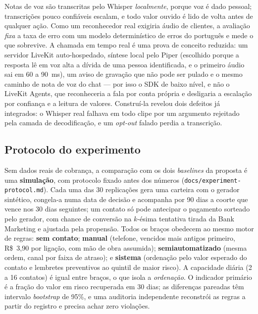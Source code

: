 \documentclass[portuguese]{sbcreviews-2025}%
\begin{document}
Notas de voz são transcritas pelo Whisper \cite{radford2023robust} \textit{localmente}, porque voz é dado pessoal; transcrições pouco confiáveis escalam, e todo valor ouvido é lido de volta antes de qualquer ação. Como um reconhecedor real exigiria áudio de clientes, a avaliação \textit{fixa} a taxa de erro com um modelo determinístico de erros do português e mede o que sobrevive. A chamada em tempo real é uma prova de conceito reduzida: um servidor LiveKit auto-hospedado, síntese local pelo Piper (escolhido porque a resposta lê em voz alta a dívida de uma pessoa identificada, e o primeiro áudio sai em 60 a 90~ms), um aviso de gravação que não pode ser pulado e o mesmo caminho de nota de voz do chat --- por isso o SDK de baixo nível, e não o LiveKit Agents, que reconheceria a fala por conta própria e desligaria a escalação por confiança e a leitura de valores. Construí-la revelou dois defeitos já integrados: o Whisper real falhava em todo clipe por um argumento rejeitado pela camada de decodificação, e um \textit{opt-out} falado perdia a transcrição.

\subsection{Protocolo do experimento}
\label{sec:protocolo}

Sem dados reais de cobrança, a comparação com os dois \textit{baselines} da proposta é uma \textbf{simulação}, com protocolo fixado antes dos números (\texttt{docs/experiment-protocol.md}). Cada uma das 30 replicações gera uma carteira com o gerador sintético, congela-a numa data de decisão e acompanha por 90 dias a coorte que vence nos 30 dias seguintes; um contato só pode antecipar o pagamento sorteado pelo gerador, com chance de conversão na $k$-ésima tentativa tirada da Bank Marketing e ajustada pela propensão. Todos os braços obedecem ao mesmo motor de regras: \textbf{sem contato}; \textbf{manual} (telefone, vencidos mais antigos primeiro, R\$~3,90 por ligação, com mão de obra assumida); \textbf{semiautomatizado} (mesma ordem, canal por faixa de atraso); e \textbf{sistema} (ordenação pelo valor esperado do contato e lembretes preventivos ao quintil de maior risco). A capacidade diária (2 a 16 contatos) é igual entre braços, o que isola a \textit{ordenação}. O indicador primário é a fração do valor em risco recuperada em 30 dias; as diferenças pareadas têm intervalo \textit{bootstrap} de 95\%, e uma auditoria independente reconstrói as regras a partir do registro e precisa achar zero violações.
\end{document}
